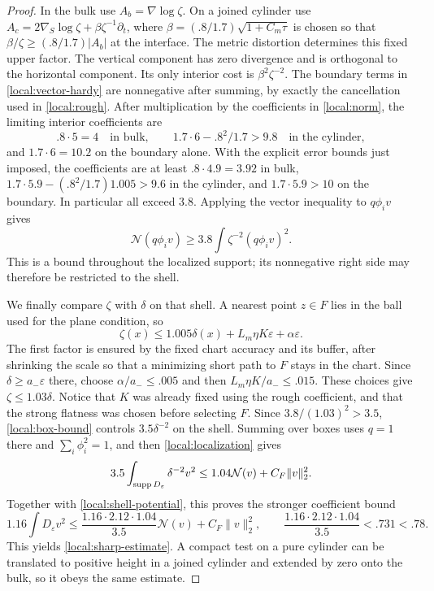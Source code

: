 \begin{proof}
In the bulk use $A_b=\nabla\log\zeta$.  On a joined cylinder use
$A_c=2\nabla_S\log\zeta+\beta\zeta^{-1}\partial_t$, where
$\beta=(.8/1.7)\sqrt{1+C_m\tau}$ is chosen so that
$\beta/\zeta\ge(.8/1.7)|A_b|$ at the interface.
The metric distortion determines this fixed upper factor.
The vertical component has zero divergence and is orthogonal to
the horizontal component.  Its only interior cost is
$\beta^2\zeta^{-2}$.  The boundary terms in
\eqref{local:vector-hardy} are nonnegative after summing, by exactly
the cancellation used in \cref{local:rough}.  After multiplication
by the coefficients in \eqref{local:norm}, the limiting interior
coefficients are
\[
 .8\cdot5=4\quad\text{in bulk},\qquad
 1.7\cdot6-.8^2/1.7>9.8\quad\text{in the cylinder},
\]
and $1.7\cdot6=10.2$ on the boundary alone.  With the explicit error
bounds just imposed, the coefficients are at least $.8\cdot4.9=3.92$
in bulk, $1.7\cdot5.9-(.8^2/1.7)1.005>9.6$ in the cylinder,
and $1.7\cdot5.9>10$ on the boundary.  In particular all exceed $3.8$.
Applying the vector inequality to $q\phi_iv$ gives
\begin{equation}\label{local:box-bound}
 \mathcal N(q\phi_iv)\ge
       3.8\int\zeta^{-2}(q\phi_iv)^2.
\end{equation}
This is a bound throughout the localized support; its nonnegative
right side may therefore be restricted to the shell.

We finally compare $\zeta$ with $\delta$ on that shell.  A nearest
point $z\in F$ lies in the ball used for the plane condition, so
\[
 \zeta(x)\le 1.005\delta(x)+L_m\eta K\varepsilon
                                  +\alpha\varepsilon.
\]
The first factor is ensured by the fixed chart accuracy and its
buffer, after shrinking the scale so that a minimizing short path
to $F$ stays in the chart.  Since $\delta\ge a_-\varepsilon$ there,
choose $\alpha/a_-\le .005$ and then
$L_m\eta K/a_-\le .015$.  These choices give
$\zeta\le1.03\delta$.  Notice that $K$ was already fixed using the
rough coefficient, and that the strong flatness was chosen before
selecting $F$.  Since $3.8/(1.03)^2>3.5$, \eqref{local:box-bound}
controls $3.5\delta^{-2}$ on the shell.  Summing over boxes uses
$q=1$ there and $\sum_i\phi_i^2=1$, and then
\eqref{local:localization} gives
\[
 3.5\int_{\operatorname{supp} D_\varepsilon}\delta^{-2}v^2
                  \le1.04\mathcal N(v)+C_F\|v\|_2^2.
\]
Together with \eqref{local:shell-potential}, this proves the stronger
coefficient bound
\[
 1.16\int D_\varepsilon v^2
 \le\frac{1.16\cdot2.12\cdot1.04}{3.5}\mathcal N(v)
                   +C_F\|v\|_2^2,
 \qquad
 \frac{1.16\cdot2.12\cdot1.04}{3.5}<.731<.78.
\]
This yields \eqref{local:sharp-estimate}.  A compact test on a pure
cylinder can be translated to positive height in a joined cylinder
and extended by zero onto the bulk, so it obeys the same estimate.
\end{proof}



